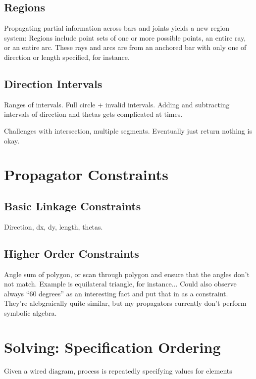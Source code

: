 \subsection{Regions}

Propagating partial information across bars and joints yields a new
region system: Regions include point sets of one or more possible
points, an entire ray, or an entire arc. These rays and arcs are
from an anchored bar with only one of direction or length specified,
for instance.

\subsection{Direction Intervals}

Ranges of intervals. Full circle + invalid intervals. Adding and
subtracting intervals of direction and thetas gets complicated at times.

Challenges with intersection, multiple segments. Eventually just
return nothing is okay.

\section{Propagator Constraints}

\subsection{Basic Linkage Constraints}

Direction, dx, dy, length, thetas.

\subsection{Higher Order Constraints}

Angle sum of polygon, or scan through polygon and ensure that the
angles don't not match. Example is equilateral triangle, for
instance... Could also observe always ``60 degrees'' as an interesting
fact and put that in as a constraint. They're alebgraically quite
similar, but my propagators currently don't perform symbolic algebra.

\section{Solving: Specification Ordering}

Given a wired diagram, process is repeatedly specifying values for elements

